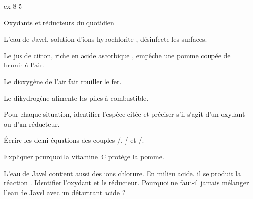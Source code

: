 \begin{blocLivre}{ex-8-5}
\begin{exercice}[1]{Oxydants et réducteurs du quotidien}
\begin{questions}[label=\otLabel{\alph*.},leftmargin=1.9em,itemsep=0pt,parsep=0.15em]
\item L'eau de Javel, solution d'ions hypochlorite , désinfecte les surfaces.
\item Le jus de citron, riche en acide ascorbique , empêche une pomme coupée de brunir à l'air.
\item Le dioxygène de l'air fait rouiller le fer.
\item Le dihydrogène alimente les piles à combustible.
\end{questions}
\begin{questions}
\item Pour chaque situation, identifier l'espèce citée et préciser s'il s'agit d'un oxydant ou d'un réducteur.
\item Écrire les demi-équations des couples /, / et /.
\item Expliquer pourquoi la vitamine~C protège la pomme.
\item L'eau de Javel contient aussi des ions chlorure. En milieu acide, il se produit la réaction
. Identifier l'oxydant et le réducteur. Pourquoi ne faut-il jamais
mélanger l'eau de Javel avec un détartrant acide ?
\end{questions}
\end{exercice}
\end{blocLivre}
